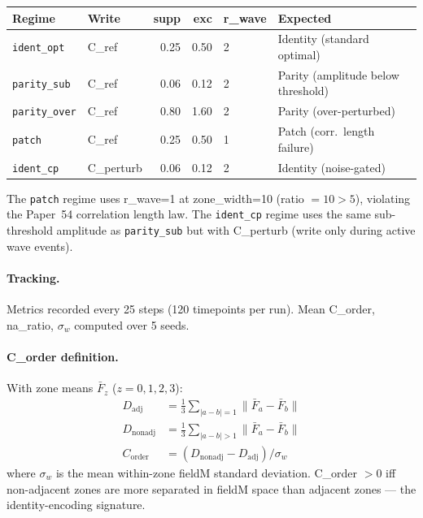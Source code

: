 \documentclass[11pt,a4paper]{article}
\begin{document}
\begin{center}
\small
\begin{tabular}{llrrll}
\toprule
Regime & Write & supp & exc & r\_wave & Expected \\
\midrule
\texttt{ident\_opt}   & C\_ref     & 0.25 & 0.50 & 2 & Identity (standard optimal) \\
\texttt{parity\_sub}  & C\_ref     & 0.06 & 0.12 & 2 & Parity (amplitude below threshold) \\
\texttt{parity\_over} & C\_ref     & 0.80 & 1.60 & 2 & Parity (over-perturbed) \\
\texttt{patch}        & C\_ref     & 0.25 & 0.50 & 1 & Patch (corr.\ length failure) \\
\texttt{ident\_cp}    & C\_perturb & 0.06 & 0.12 & 2 & Identity (noise-gated) \\
\bottomrule
\end{tabular}
\end{center}

The \texttt{patch} regime uses r\_wave=1 at zone\_width=10 (ratio $= 10 > 5$),
violating the Paper~54 correlation length law.
The \texttt{ident\_cp} regime uses the same sub-threshold amplitude as
\texttt{parity\_sub} but with C\_perturb (write only during active wave events).

\paragraph{Tracking.}
Metrics recorded every 25 steps (120 timepoints per run).
Mean C\_order, na\_ratio, $\sigma_w$ computed over 5 seeds.

\paragraph{C\_order definition.}
With zone means $\bar{F}_z$ ($z=0,1,2,3$):
\begin{align}
D_\mathrm{adj}    &= \tfrac{1}{3}\sum_{|a-b|=1} \|\bar{F}_a - \bar{F}_b\| \\
D_\mathrm{nonadj} &= \tfrac{1}{3}\sum_{|a-b|>1} \|\bar{F}_a - \bar{F}_b\| \\
C_\mathrm{order}  &= (D_\mathrm{nonadj} - D_\mathrm{adj}) / \sigma_w
\end{align}
where $\sigma_w$ is the mean within-zone fieldM standard deviation.
C\_order $> 0$ iff non-adjacent zones are more separated in fieldM space than
adjacent zones --- the identity-encoding signature.

\end{document}
